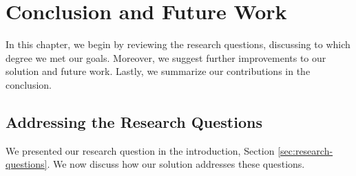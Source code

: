 \chapter{Conclusion and Future Work}
\label{cha:conclusion-and-future-work}

In this chapter, we begin by reviewing the research questions, discussing to which degree we met our goals. Moreover, we suggest further improvements to our solution and future work. Lastly, we summarize our contributions in the conclusion.

\section{Addressing the Research Questions}
We presented our research question in the introduction, Section \vref{sec:research-questions}. We now discuss how our solution addresses these questions.

